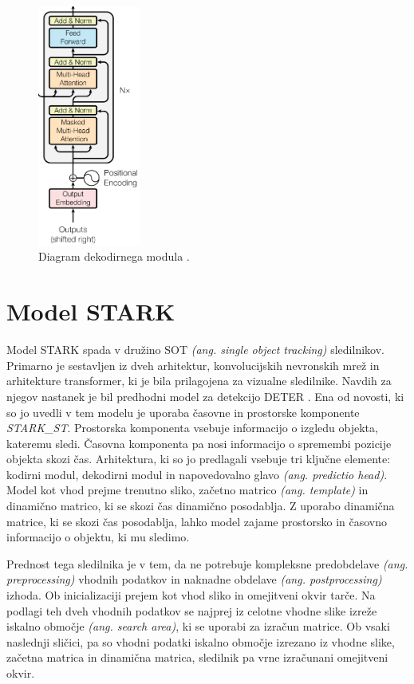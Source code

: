 \documentclass[a4paper,12pt,openright]{book}
\begin{document}
\begin{figure}[htb]
    \begin{center}
        \includegraphics[width=0.3\textwidth]{img/decoder.png}
    \end{center}
    \caption{Diagram dekodirnega modula \cite{attention_is_all_you_need}.}
    \label{img:decoder}
\end{figure}

\section{Model STARK}
\label{sec:stark}
Model STARK \cite{stark} spada v družino SOT \emph{(ang. single object tracking)} sledilnikov. Primarno je sestavljen iz dveh arhitektur, konvolucijskih nevronskih mrež in arhitekture transformer, ki je bila prilagojena za vizualne sledilnike. Navdih za njegov nastanek je bil predhodni model za detekcijo DETER \cite{deter}. Ena od novosti, ki so jo uvedli v tem modelu je uporaba časovne in prostorske komponente \emph{STARK\_ST}. Prostorska komponenta vsebuje informacijo o izgledu objekta, kateremu sledi. Časovna komponenta pa nosi informacijo o spremembi pozicije objekta skozi čas.
Arhitektura, ki so jo predlagali vsebuje tri ključne elemente: kodirni modul, dekodirni modul in napovedovalno glavo \emph{(ang. predictio head)}. Model kot vhod prejme trenutno sliko, začetno matrico \emph{(ang. template)} in dinamično matrico, ki se skozi čas dinamično posodablja. Z uporabo dinamična matrice, ki se skozi čas posodablja, lahko model zajame prostorsko in časovno informacijo o objektu, ki mu sledimo.

Prednost tega sledilnika je v tem, da ne potrebuje kompleksne predobdelave \emph{(ang. preprocessing)} vhodnih podatkov in naknadne obdelave \emph{(ang. postprocessing)} izhoda. Ob inicializaciji prejem kot vhod sliko in omejitveni okvir tarče. Na podlagi teh dveh vhodnih podatkov se najprej iz celotne vhodne slike izreže iskalno območje \emph{(ang. search area)}, ki se uporabi za izračun matrice. Ob vsaki naslednji sličici, pa so vhodni podatki iskalno območje izrezano iz vhodne slike, začetna matrica in dinamična matrica, sledilnik pa vrne izračunani omejitveni okvir.
\end{document}
